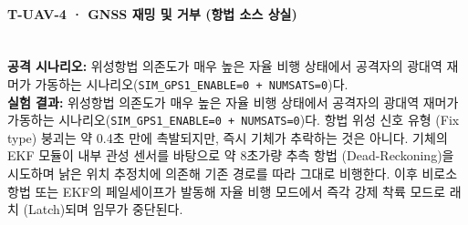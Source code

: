 \paragraph{\textbf{T-UAV-4 · GNSS 재밍 및 거부 (항법 소스 상실)}} ~\\
\textbf{공격 시나리오:} 
위성항법 의존도가 매우 높은 자율 비행 상태에서 공격자의 광대역 재머가 가동하는 시나리오(\texttt{SIM\_GPS1\_ENABLE=0 + NUMSATS=0})다.
\\
%
%
\textbf{실험 결과:} 
위성항법 의존도가 매우 높은 자율 비행 상태에서 공격자의 광대역 재머가 가동하는 시나리오(\texttt{SIM\_GPS1\_ENABLE=0 + NUMSATS=0})다. 항법 위성 신호 유형 (Fix type) 붕괴는 약 0.4초 만에 촉발되지만, 즉시 기체가 추락하는 것은 아니다. 기체의 EKF 모듈이 내부 관성 센서를 바탕으로 약 8초가량 추측 항법 (Dead-Reckoning)을 시도하며 낡은 위치 추정치에 의존해 기존 경로를 따라 그대로 비행한다. 이후 비로소 항법 또는 EKF의 페일세이프가 발동해 자율 비행 모드에서 즉각 강제 착륙 모드로 래치 (Latch)되며 임무가 중단된다.
\\
